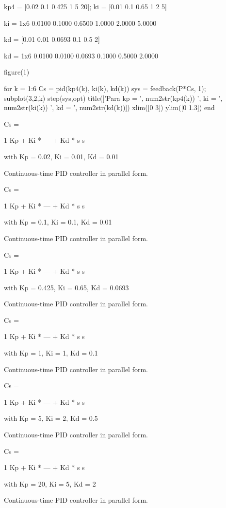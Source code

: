 \documentclass[a4paper, 12pt]{article}
\begin{document}
\begin{matlabcode}
kp4 = [0.02 0.1 0.425 1 5 20];
ki = [0.01 0.1 0.65 1 2 5] 
\end{matlabcode}
\begin{matlaboutput}
ki = 1x6    
    0.0100    0.1000    0.6500    1.0000    2.0000    5.0000

\end{matlaboutput}
\begin{matlabcode}
kd = [0.01 0.01 0.0693 0.1 0.5 2]
\end{matlabcode}
\begin{matlaboutput}
kd = 1x6    
    0.0100    0.0100    0.0693    0.1000    0.5000    2.0000

\end{matlaboutput}
\begin{matlabcode}

figure(1)

for k = 1:6
    Cs = pid(kp4(k), ki(k), kd(k))
    sys = feedback(P*Cs, 1);
    subplot(3,2,k)
    step(sys,opt)
    title(['Para kp = ', num2str(kp4(k)) ', ki = ', num2str(ki(k)) 
    ', kd = ', num2str(kd(k))])
    xlim([0 3])
    ylim([0 1.3])
end
\end{matlabcode}
\begin{matlaboutput}
Cs =
 
             1          
  Kp + Ki * --- + Kd * s
             s          

  with Kp = 0.02, Ki = 0.01, Kd = 0.01
 
Continuous-time PID controller in parallel form.

Cs =
 
             1          
  Kp + Ki * --- + Kd * s
             s          

  with Kp = 0.1, Ki = 0.1, Kd = 0.01
 
Continuous-time PID controller in parallel form.

Cs =
 
             1          
  Kp + Ki * --- + Kd * s
             s          

  with Kp = 0.425, Ki = 0.65, Kd = 0.0693
 
Continuous-time PID controller in parallel form.

Cs =
 
             1          
  Kp + Ki * --- + Kd * s
             s          

  with Kp = 1, Ki = 1, Kd = 0.1
 
Continuous-time PID controller in parallel form.

Cs =
 
             1          
  Kp + Ki * --- + Kd * s
             s          

  with Kp = 5, Ki = 2, Kd = 0.5
 
Continuous-time PID controller in parallel form.

Cs =
 
             1          
  Kp + Ki * --- + Kd * s
             s          

  with Kp = 20, Ki = 5, Kd = 2
 
Continuous-time PID controller in parallel form.
\end{matlaboutput}
\end{document}
